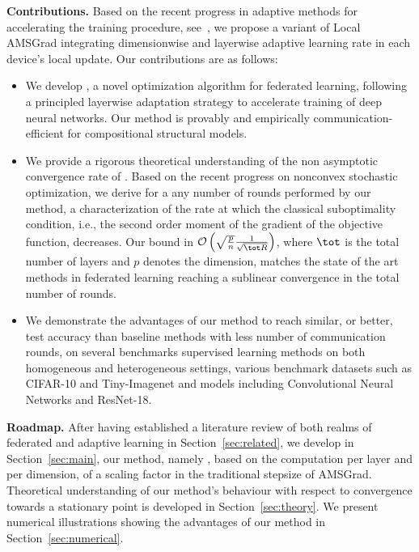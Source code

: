 \documentclass[twoside]{article}
\begin{document}
\noindent\textbf{Contributions.} Based on the recent progress in adaptive methods for accelerating the training procedure, see~\citet{you2019large}, we propose a variant of Local AMSGrad integrating dimensionwise and layerwise adaptive learning rate in each device's local update.
Our contributions are as follows:
\begin{itemize}
\item We develop  \algo, a novel optimization algorithm for federated learning, following a principled layerwise adaptation strategy to accelerate training of deep neural networks. Our method is provably and empirically communication-efficient for compositional structural models.
\item We provide a rigorous theoretical understanding of the non asymptotic convergence rate of \algo. 
Based on the recent progress on nonconvex stochastic optimization, we derive for a any number of rounds performed by our method, a characterization of the rate at which the classical suboptimality condition, i.e., the second order moment of the gradient of the objective function, decreases. Our bound  in $\mathcal{O}\left(\sqrt{\frac{ p}{ n}} \frac{1}{\sqrt{\tot R} } \right)$, where $\tot$ is the total number of layers and $p$ denotes the dimension, matches the state of the art methods in federated learning reaching a sublinear convergence in the total number of rounds.
\item We demonstrate the advantages of our method to reach similar, or better, test accuracy than baseline methods with less number of communication rounds, on several benchmarks supervised learning methods on both homogeneous and heterogeneous settings, various benchmark datasets such as CIFAR-10 and Tiny-Imagenet and models including Convolutional Neural Networks and ResNet-18.
\end{itemize}

\vspace{0.1in}
\noindent\textbf{Roadmap.} After having established a literature review of both realms of federated and adaptive learning in Section~\ref{sec:related}, we develop in Section~\ref{sec:main}, our method, namely \algo, based on the computation per layer and per dimension, of a scaling factor in the traditional stepsize of AMSGrad.
Theoretical understanding of our method's behaviour with respect to convergence towards a stationary point is developed in Section~\ref{sec:theory}.
We present numerical illustrations showing the advantages of our method in Section~\ref{sec:numerical}.
\end{document}
